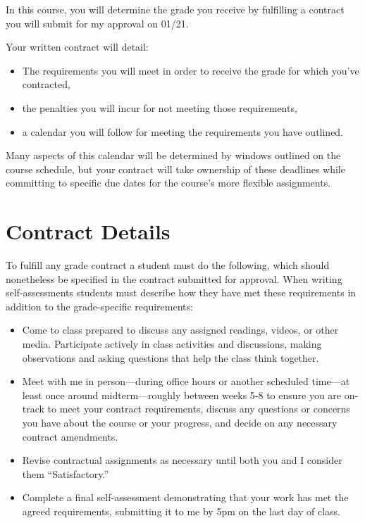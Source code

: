 \documentclass[
]{book}
\begin{document}
In this course, you will determine the grade you receive by fulfilling a contract you will submit for my approval on 01/21.

Your written contract will detail:

\begin{itemize}
\item
  The requirements you will meet in order to receive the grade for which you've contracted,
\item
  the penalties you will incur for not meeting those requirements,
\item
  a calendar you will follow for meeting the requirements you have outlined.
\end{itemize}

Many aspects of this calendar will be determined by windows outlined on the course schedule, but your contract will take ownership of these deadlines while committing to specific due dates for the course's more flexible assignments.

\hypertarget{contract-details}{%
\section{Contract Details}\label{contract-details}}

To fulfill any grade contract a student must do the following, which should nonetheless be specified in the contract submitted for approval. When writing self-assessments students must describe how they have met these requirements in addition to the grade-specific requirements:

\begin{itemize}
\item
  Come to class prepared to discuss any assigned readings, videos, or other media. Participate actively in class activities and discussions, making observations and asking questions that help the class think together.
\item
  Meet with me in person---during office hours or another scheduled time---at least once around midterm---roughly between weeks 5-8 to ensure you are on-track to meet your contract requirements, discuss any questions or concerns you have about the course or your progress, and decide on any necessary contract amendments.
\item
  Revise contractual assignments as necessary until both you and I consider them ``Satisfactory.''
\item
  Complete a final self-assessment demonstrating that your work has met the agreed requirements, submitting it to me by 5pm on the last day of class.
\end{itemize}
\end{document}
